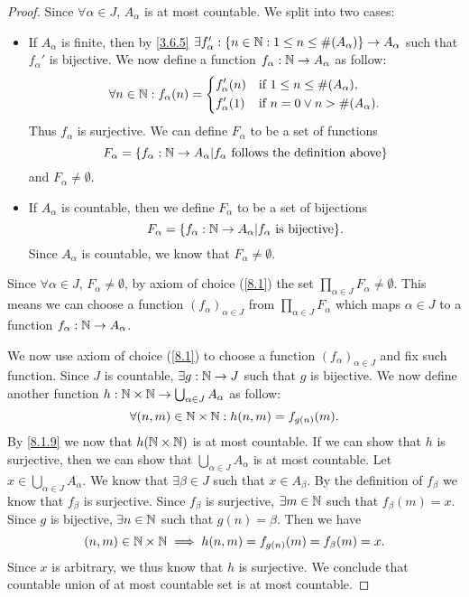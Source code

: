 \begin{proof}
	Since \(\forall \alpha \in J\), \(A_{\alpha}\) is at most countable.
	We split into two cases:
	\begin{itemize}
		\item If \(A_{\alpha}\) is finite, then by \cref{3.6.5} \(\exists f_{\alpha}' : \left\lbrace n \in \mathbb{N} : 1 \leq n \leq \#(A_{\alpha})\right\rbrace \to A_{\alpha}\) such that \(f_{\alpha}'\) is bijective.
		      We now define a function \(f_{\alpha} : \mathbb{N} \to A_{\alpha}\) as follow:
		      \[
			      \forall n \in \mathbb{N} : f_{\alpha}(n) = \begin{dcases}
				      f_{\alpha}'(n) & \text{if } 1 \leq n \leq \#(A_{\alpha}),  \\
				      f_{\alpha}'(1) & \text{if } n = 0 \lor n > \#(A_{\alpha}).
			      \end{dcases}
		      \]
		      Thus \(f_{\alpha}\) is surjective.
		      We can define \(F_{\alpha}\) to be a set of functions
		      \[
			      F_{\alpha} = \left\lbrace f_{\alpha} : \mathbb{N} \to A_{\alpha} | f_{\alpha} \text{ follows the definition above}\right\rbrace
		      \]
		      and \(F_{\alpha} \neq \emptyset\).
		\item If \(A_{\alpha}\) is countable, then we define \(F_{\alpha}\) to be a set of bijections
		      \[
			      F_{\alpha} = \set{f_{\alpha} : \N \to A_{\alpha} | f_{\alpha} \text{ is bijective}}.
		      \]
		      Since \(A_{\alpha}\) is countable, we know that \(F_{\alpha} \neq \emptyset\).
	\end{itemize}
	Since \(\forall \alpha \in J\), \(F_{\alpha} \neq \emptyset\), by axiom of choice (\cref{8.1}) the set \(\prod_{\alpha \in J} F_{\alpha} \neq \emptyset\).
	This means we can choose a function \((f_{\alpha})_{\alpha \in J}\) from \(\prod_{\alpha \in J} F_{\alpha}\) which maps \(\alpha \in J\) to a function \(f_{\alpha} : \mathbb{N} \to A_{\alpha}\).

	We now use axiom of choice (\cref{8.1}) to choose a function \((f_{\alpha})_{\alpha \in J}\) and fix such function.
	Since \(J\) is countable, \(\exists g : \mathbb{N} \to J\) such that \(g\) is bijective.
	We now define another function \(h : \mathbb{N} \times \mathbb{N} \to \bigcup_{\alpha \in J} A_{\alpha}\) as follow:
	\[
		\forall (n, m) \in \mathbb{N} \times \mathbb{N} : h(n, m) = f_{g(n)}(m).
	\]
	By \cref{8.1.9} we now that \(h(\mathbb{N} \times \mathbb{N})\) is at most countable.
	If we can show that \(h\) is surjective, then we can show that \(\bigcup_{\alpha \in J} A_{\alpha}\) is at most countable.
	Let \(x \in \bigcup_{\alpha \in J} A_{\alpha}\).
	We know that \(\exists \beta \in J\) such that \(x \in A_{\beta}\).
	By the definition of \(f_{\beta}\) we know that \(f_{\beta}\) is surjective.
	Since \(f_{\beta}\) is surjective, \(\exists m \in \mathbb{N}\) such that \(f_{\beta}(m) = x\).
	Since \(g\) is bijective, \(\exists n \in \mathbb{N}\) such that \(g(n) = \beta\).
	Then we have
	\[
		(n, m) \in \mathbb{N} \times \mathbb{N} \implies h(n, m) = f_{g(n)}(m) = f_{\beta}(m) = x.
	\]
	Since \(x\) is arbitrary, we thus know that \(h\) is surjective.
	We conclude that countable union of at most countable set is at most countable.


\end{proof}
